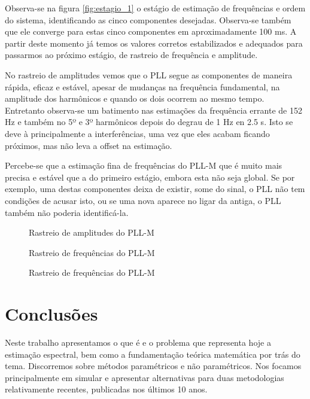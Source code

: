 Observa-se na figura \ref{fig:estagio_1} o estágio de estimação de frequências e ordem do sistema, identificando as cinco componentes desejadas. Observa-se também que ele converge para estas cinco componentes em aproximadamente 100 ms. A partir deste momento já temos os valores corretos estabilizados e adequados para passarmos ao próximo estágio, de rastreio de frequência e amplitude. 

\indent No rastreio de amplitudes vemos que o PLL segue as componentes de maneira rápida, eficaz e estável, apesar de mudanças na frequência fundamental, na amplitude dos harmônicos e quando os dois ocorrem ao mesmo tempo. Entretanto observa-se um batimento nas estimações da frequência errante de 152 Hz e também no 5º e 3º harmônicos depois do degrau de 1 Hz en 2.5 s. Isto se deve à principalmente a interferências, uma vez que eles acabam ficando próximos, mas não leva a offset na estimação.

\indent Percebe-se que a estimação fina de frequências do PLL-M que é muito mais precisa e estável que a do primeiro estágio, embora esta não seja global. Se por exemplo, uma destas componentes deixa de existir, some do sinal, o PLL não tem condições de acusar isto, ou se uma nova aparece no ligar da antiga, o PLL também não poderia identificá-la.

\begin{figure}[H]
	\centering    
	\def\svgwidth{\columnwidth}
	
	\caption{Rastreio de amplitudes do PLL-M}
	\label{fig:rastreio_final}
\end{figure}

\begin{figure}[H]
	\centering    
	\def\svgwidth{\columnwidth}
	
	\caption{Rastreio de frequências do PLL-M}
	\label{fig:amplitudes}
\end{figure}
\begin{figure}[H]
	\centering    
	\def\svgwidth{\columnwidth}
	
	\caption{Rastreio de frequências do PLL-M}
	\label{fig:amplitudes}
\end{figure}


\section{Conclusões}

Neste trabalho apresentamos o que é e o problema que representa hoje a estimação espectral, bem como a fundamentação teórica matemática por trás do tema. Discorremos sobre métodos paramétricos e não paramétricos. Nos focamos principalmente em simular e apresentar alternativas para duas metodologias relativamente recentes, publicadas nos últimos 10 anos. 

